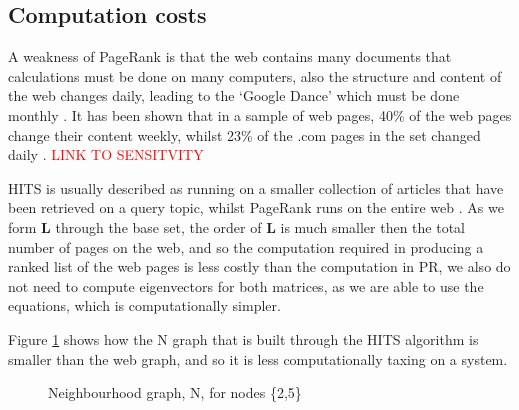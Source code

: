 \documentclass[11pt]{report}
\begin{document}
{\subsection{Computation costs}
A weakness of PageRank is that the web contains many documents that calculations must be done on many computers, also the structure and content of the web changes daily, leading to the `Google Dance' which must be done monthly \cite{thorson2004modeling}. It has been shown that in a sample of web pages, 40\% of the web pages change their content weekly, whilst 23\% of the .com pages in the set changed daily \cite{cho1999evolution}. \textcolor{red}{LINK TO SENSITVITY}

HITS is usually described as running on a smaller collection of articles that have been retrieved on a query topic, whilst PageRank runs on the entire web \cite{ng2001link}. As we form \textbf{L} through the base set, the order of \textbf{L} is much smaller then the total number of pages on the web, and so the computation required in producing a ranked list of the web pages is less costly than the computation in PR, we also do not need to compute eigenvectors for both matrices, as we are able to use the equations, which is computationally simpler. 

Figure \ref{fig:N build} shows how the N graph that is built through the HITS algorithm is smaller than the web graph, and so it is less computationally taxing on a system.

\begin{figure}[h] 
\centering
{} \qquad\qquad
{}
\caption{Neighbourhood graph, N,  for nodes \{2,5\} } \label{fig:N build}
\end{figure}

}
\end{document}

